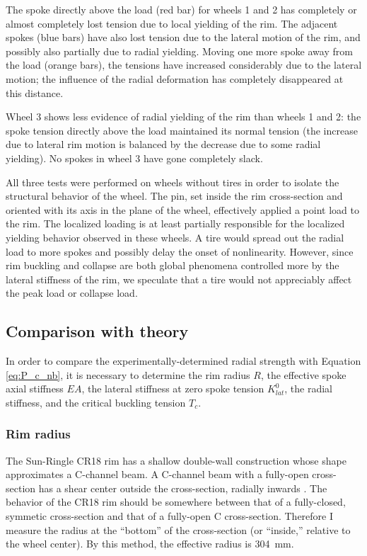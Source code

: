 \documentclass[\rootdir/thesis.tex]{subfiles}
\begin{document}
The spoke directly above the load (red bar) for wheels 1 and 2 has completely or almost completely lost tension due to local yielding of the rim. The adjacent spokes (blue bars) have also lost tension due to the lateral motion of the rim, and possibly also partially due to radial yielding. Moving one more spoke away from the load (orange bars), the tensions have increased considerably due to the lateral motion; the influence of the radial deformation has completely disappeared at this distance.

Wheel 3 shows less evidence of radial yielding of the rim than wheels 1 and 2: the spoke tension directly above the load maintained its normal tension (the increase due to lateral rim motion is balanced by the decrease due to some radial yielding). No spokes in wheel 3 have gone completely slack.

All three tests were performed on wheels without tires in order to isolate the structural behavior of the wheel. The pin, set inside the rim cross-section and oriented with its axis in the plane of the wheel, effectively applied a point load to the rim. The localized loading is at least partially responsible for the localized yielding behavior observed in these wheels. A tire would spread out the radial load to more spokes and possibly delay the onset of nonlinearity. However, since rim buckling and collapse are both global phenomena controlled more by the lateral stiffness of the rim, we speculate that a tire would not appreciably affect the peak load or collapse load.

\subsection{Comparison with theory}

In order to compare the experimentally-determined radial strength with Equation \eqref{eq:P_c_nb}, it is necessary to determine the rim radius $R$, the effective spoke axial stiffness $EA$, the lateral stiffness at zero spoke tension $K_{lat}^0$, the radial stiffness, and the critical buckling tension $T_c$.

\subsubsection{Rim radius}

The Sun-Ringle CR18 rim has a shallow double-wall construction whose shape approximates a C-channel beam. A C-channel beam with a fully-open cross-section has a shear center outside the cross-section, radially inwards \cite{Timoshenko1961}. The behavior of the CR18 rim should be somewhere between that of a fully-closed, symmetic cross-section and that of a fully-open C cross-section. Therefore I measure the radius at the ``bottom'' of the cross-section (or ``inside,'' relative to the wheel center). By this method, the effective radius is \SI{304}{mm}.
\end{document}
